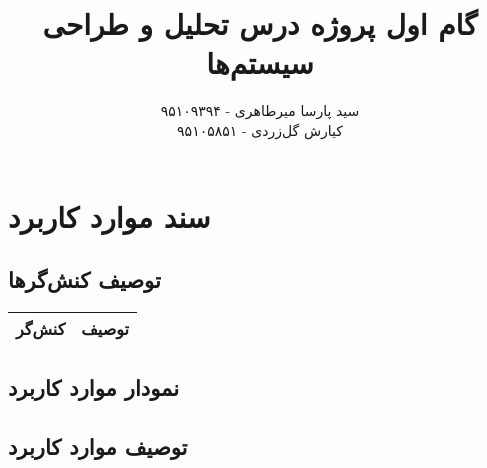 \documentclass{article}
\title{\textbf{گام اول پروژه درس تحلیل و طراحی سیستم‌ها}}
\author{سید پارسا میرطاهری - ۹۵۱۰۹۳۹۴ \\ کیارش گل‌زردی - ۹۵۱۰۵۸۵۱}
\begin{document}
\date{}

\maketitle

\section{سند موارد کاربرد}

\subsection{توصیف کنش‌گرها}

\begin{center}
\begin{tabular} {|c|c|}
\hline
کنش‌گر & توصیف \\
\hline	
\end{tabular}	
\end{center}

\subsection{نمودار موارد کاربرد}

\subsection{توصیف موارد کاربرد}
\end{document}
